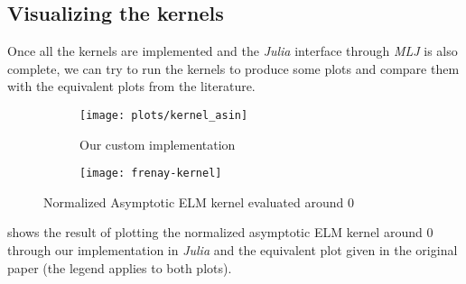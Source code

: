 
\subsection{Visualizing the kernels}

Once all the kernels are implemented and the \emph{Julia} interface through
\emph{MLJ} is also complete, we can try to run the kernels to produce some
plots and compare them with the equivalent plots from the literature.

\begin{figure}[H]
    \begin{subfigure}{.59\textwidth}
        \texttt{[image: plots/kernel\_asin]}
        \caption{Our custom implementation}
    \end{subfigure} \begin{subfigure}{.40\textwidth}
        \texttt{[image: frenay-kernel]}
        \caption{\textcite{frenayParameterinsensitiveKernelExtreme2011}}
    \end{subfigure}
    \caption{Normalized Asymptotic ELM kernel evaluated around 0}
    \label{fig:kernel_asin_comparison}
\end{figure}

 shows the result of plotting the normalized
asymptotic ELM kernel around 0 through our implementation in \emph{Julia} and
the equivalent plot given in the original paper (the legend applies to both
plots).

